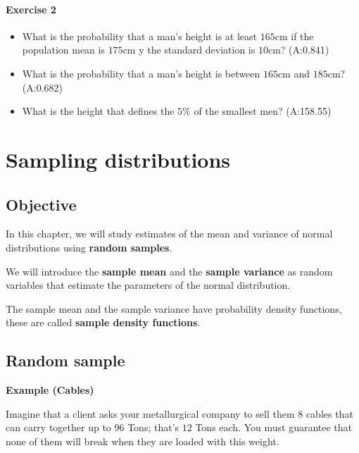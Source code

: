 \documentclass[
]{book}
\begin{document}
\hypertarget{exercise-2-6}{%
\subsubsection{Exercise 2}\label{exercise-2-6}}

\begin{itemize}
\item
  What is the probability that a man's height is at least
  \(165\)cm if the population mean is \(175\)cm y the standard deviation is \(10\)cm? (A:0.841)
\item
  What is the probability that a man's height is between
  \(165\)cm and \(185\)cm? (A:0.682)
\item
  What is the height that defines the \(5\%\) of the smallest men? (A:158.55)
\end{itemize}

\hypertarget{sampling-distributions}{%
\chapter{Sampling distributions}\label{sampling-distributions}}

\hypertarget{objective-5}{%
\section{Objective}\label{objective-5}}

In this chapter, we will study estimates of the mean and variance of normal distributions using \textbf{random samples}.

We will introduce the \textbf{sample mean} and the \textbf{sample variance} as random variables that estimate the parameters of the normal distribution.

The sample mean and the sample variance have probability density functions, these are called \textbf{sample density functions}.

\hypertarget{random-sample}{%
\section{Random sample}\label{random-sample}}

\textbf{Example (Cables)}

Imagine that a client asks your metallurgical company to sell them \(8\) cables that can carry together up to \(96\) Tons; that's \(12\) Tons each. You must guarantee that none of them will break when they are loaded with this weight.
\end{document}

